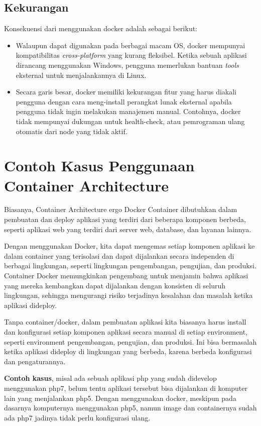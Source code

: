 \subsection{Kekurangan}
Konsekuensi dari menggunakan docker adalah sebagai berikut:
\begin{itemize}
\item Walaupun dapat digunakan pada berbagai macam OS, docker mempunyai kompatibilitas \textit{cross-platform} yang kurang fleksibel. Ketika sebuah aplikasi dirancang menggunakan Windows, pengguna memerlukan bantuan \textit{tools} eksternal untuk menjalankannya di Linux.
\item Secara garis besar, docker memiliki kekurangan fitur yang harus diakali pengguna dengan cara meng-install perangkat lunak eksternal apabila pengguna tidak ingin melakukan manajemen manual. Contohnya, docker tidak mempunyai dukungan untuk health-check, atau pemrograman ulang otomatis dari node yang tidak aktif.
\end{itemize}

\section{Contoh Kasus Penggunaan Container Architecture}

Biasanya, Container Architecture ergo Docker Container dibutuhkan dalam pembuatan dan deploy aplikasi yang terdiri dari beberapa komponen berbeda, seperti {aplikasi web} yang terdiri dari server web, database, dan layanan lainnya.

Dengan menggunakan Docker, kita dapat mengemas setiap komponen aplikasi ke dalam container yang terisolasi dan dapat dijalankan secara independen di berbagai lingkungan, seperti lingkungan pengembangan, pengujian, dan produksi. Container Docker memungkinkan pengembang untuk menjamin bahwa aplikasi yang mereka kembangkan dapat dijalankan dengan konsisten di seluruh lingkungan, sehingga mengurangi risiko terjadinya kesalahan dan masalah ketika aplikasi dideploy.

Tanpa container/docker, dalam pembuatan aplikasi kita biasanya harus install dan konfigurasi setiap komponen aplikasi secara manual di setiap environment, seperti environment pengembangan, pengujian, dan produksi. Ini bisa bermasalah ketika aplikasi dideploy di lingkungan yang berbeda, karena berbeda konfigurasi dan pengaturannya. 

\textbf{Contoh kasus}, misal ada sebuah aplikasi php yang sudah didevelop menggunakan php7, belum tentu aplikasi tersebut bisa dijalankan di komputer lain yang menjalankan php5. Dengan menggunakan docker, meskipun pada dasarnya komputernya menggunakan php5, namun image dan containernya sudah ada php7 jadinya tidak perlu konfigurasi ulang.

